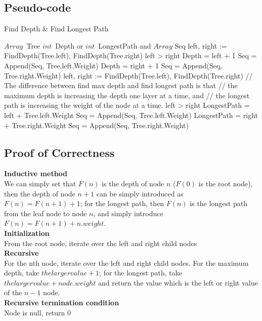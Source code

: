 \documentclass{article}
\begin{document}
\subsection{Pseudo-code}
\begin{algorithm}
    \caption{Find Depth \& Find Longest Path}
    \begin{algorithmic}[1] 
        \Require $Array$\ Tree 
        \Ensure $int$\ Depth or $int$\ LongestPath and $Array$ Seq
             \State {}
            \EndIf
            \State left, right := FindDepth(Tree.left), FindDepth(Tree.right)
            \If left > right
                \State Depth = left + 1
                \State Seq = Append(Seq, Tree.left.Weight)
            \Else
                \State Depth = right + 1
                \State Seq = Append(Seq, Tree.right.Weight)
            \EndIf
            \State {}
        \EndFunction
        \State
                \State {}
            \EndIf
            \State left, right := FindDepth(Tree.left), FindDepth(Tree.right)
            \State // The difference between find max depth and find longest path is that 
            \State // the maximum depth is increasing the depth one layer at a time, and 
            \State // the longest path is increasing the weight of the node at a time.
            \If left > right
                \State LongestPath = left + Tree.left.Weight
                \State Seq = Append(Seq, Tree.left.Weight)
            \Else
                \State LongestPath = right + Tree.right.Weight
                \State Seq = Append(Seq, Tree.right.Weight)
            \EndIf
            \State {}
        \EndFunction
    \end{algorithmic}  
\end{algorithm} 
\clearpage
\subsection{Proof of Correctness}
\textbf{Inductive method}\\
We can simply set that $F(n)$ is the depth of node $n$ ($F(0)$ is the root node), then the depth of node $n+1$ can be simply introduced as $F(n) = F(n+1)+1$; for the longest path, then $F(n)$ is the longest path from the leaf node to node $n$, and simply introduce $F(n) = F(n+1)+n.weight$.\\
\textbf{Initialization}\\
From the root node, iterate over the left and right child nodes\\
\textbf{Recursive}\\
For the nth node, iterate over the left and right child nodes. For the maximum depth, take $the larger value + 1$; for the longest path, take $the larger value + node.weight$ and return the value which is the left or right value of the $n-1$ node.\\
\textbf{Recursive termination condition}\\
Node is null, return 0\\
\end{document}
